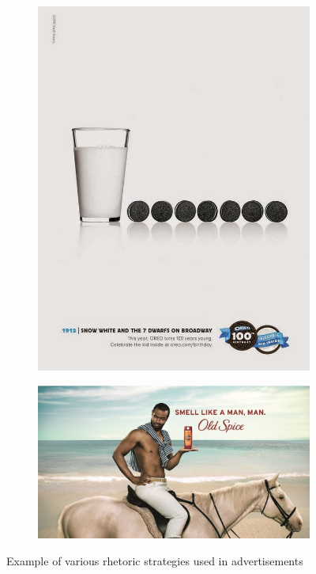 \begin{figure}
\begin{subfigure}[b]{0.3\textwidth}
         \includegraphics[width=\textwidth,scale=0.68]{images/Oreo_SnowWhite.jpeg}
         \label{fig:oreo}
     \end{subfigure}
     \begin{subfigure}[b]{0.6\textwidth}
         \centering
         \includegraphics[width=\textwidth,scale=1.0]{images/old-spice.jpeg}
         \label{fig:old-spice}
     \end{subfigure}
     
    \caption{Example of various rhetoric strategies used in advertisements}
    \label{fig:rhetoric-strategies-ads}
\end{figure}




